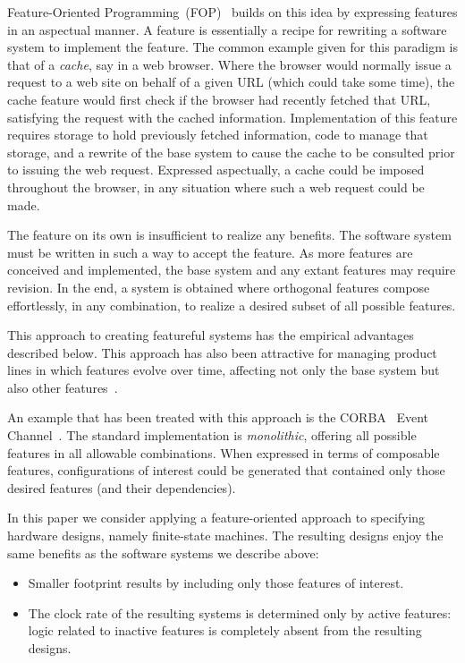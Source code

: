 \documentclass[sigplan,anonymous,review]{acmart}
\begin{document}
Feature-Oriented Programming~(FOP)~\cite{prehofer1997feature} builds on this idea by expressing features in an aspectual manner. A feature is essentially a recipe for rewriting a software system to implement the feature. The common example given for this paradigm is that of a \emph{cache}, say in a web browser.  Where the browser would normally issue a request to a web site on behalf of a given URL (which could take some time), the cache feature would first check if the browser had recently fetched that URL, satisfying the request with the cached information. Implementation of this feature requires storage to hold previously fetched information, code to manage that storage, and a rewrite of the base system to cause the cache to be consulted prior to issuing the web request. Expressed aspectually, a cache could be imposed throughout the browser, in any situation where such a web request could be made. 

The feature on its own is insufficient to realize any benefits. The software system must be written in such a way to accept the feature. As more features are conceived and implemented, the base system and any extant features may require revision. In the end, a system is obtained where orthogonal features compose effortlessly, in any combination, to realize a desired subset of all possible features.

This approach to creating featureful systems has the empirical advantages described below. This approach has also been attractive for managing product lines in which features evolve over time, affecting not only the base system but also other features~\cite{10.1145/2897695.2897701}.

An example that has been treated with this approach is the CORBA~\cite{CORBA:00} Event Channel~\cite{CORBAService:02a}. The standard implementation is \emph{monolithic}, offering all possible features in all allowable combinations.    
When expressed in terms of composable features, configurations of interest could be generated that contained only those desired features (and their dependencies).


In this paper we consider applying a feature-oriented approach to specifying hardware designs, namely finite-state machines.
The resulting designs enjoy the same benefits as the software systems we describe above:
\begin{itemize}
    \item Smaller footprint results by including only those features of interest.
    \item The clock rate of the resulting systems is determined only by active features:  logic related to inactive features is completely absent from the resulting designs.
\end{itemize}
\end{document}

